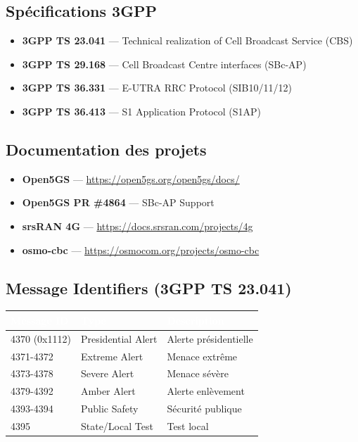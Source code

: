 \documentclass[11pt,a4paper]{article}
\begin{document}
\subsection{Spécifications 3GPP}

\begin{itemize}[leftmargin=2cm]
    \item[\faBook] \textbf{3GPP TS 23.041} — Technical realization of Cell Broadcast Service (CBS)
    \item[\faBook] \textbf{3GPP TS 29.168} — Cell Broadcast Centre interfaces (SBc-AP)
    \item[\faBook] \textbf{3GPP TS 36.331} — E-UTRA RRC Protocol (SIB10/11/12)
    \item[\faBook] \textbf{3GPP TS 36.413} — S1 Application Protocol (S1AP)
\end{itemize}

\subsection{Documentation des projets}

\begin{itemize}[leftmargin=2cm]
    \item[\faGithub] \textbf{Open5GS} — \url{https://open5gs.org/open5gs/docs/}
    \item[\faGithub] \textbf{Open5GS PR \#4864} — SBc-AP Support
    \item[\faGithub] \textbf{srsRAN 4G} — \url{https://docs.srsran.com/projects/4g}
    \item[\faGithub] \textbf{osmo-cbc} — \url{https://osmocom.org/projects/osmo-cbc}
\end{itemize}

\subsection{Message Identifiers (3GPP TS 23.041)}

\begin{center}
\begin{tabular}{|l|l|l|}
\hline
\rowcolor{pkfblue}
\textcolor{white}{\textbf{Message ID}} & \textcolor{white}{\textbf{Type}} & \textcolor{white}{\textbf{Description}} \\
\hline
4370 (0x1112) & Presidential Alert & Alerte présidentielle \\
\hline
4371-4372 & Extreme Alert & Menace extrême \\
\hline
4373-4378 & Severe Alert & Menace sévère \\
\hline
4379-4392 & Amber Alert & Alerte enlèvement \\
\hline
4393-4394 & Public Safety & Sécurité publique \\
\hline
4395 & State/Local Test & Test local \\
\hline
\end{tabular}
\end{center}
\end{document}
